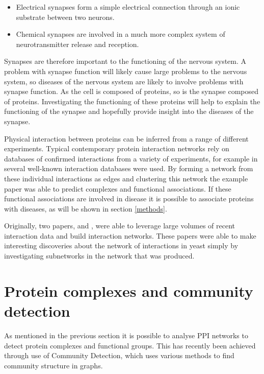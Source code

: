 \begin{itemize}
    \item Electrical synapses form a simple electrical connection through an ionic substrate between two neurons.
    \item Chemical synapses are involved in a much more complex system of neurotransmitter release and reception.
\end{itemize}

Synapses are therefore important to the functioning of the nervous system.
A problem with synapse function will likely cause large problems to the nervous system, so diseases of the nervous system are likely to involve problems with synapse function.
As the cell is composed of proteins, so is the synapse composed of proteins.
Investigating the functioning of these proteins will help to explain the functioning of the synapse and hopefully provide insight into the diseases of the synapse.

Physical interaction between proteins can be inferred from a range of different experiments.
Typical contemporary protein interaction networks rely on databases of confirmed interactions from a variety of experiments, for example in \textcite{kenley_detecting_2011} several well-known interaction databases were used.
By forming a network from these individual interactions as edges and clustering this network the example paper was able to predict complexes and functional associations.
If these functional associations are involved in disease it is possible to associate proteins with diseases, as will be shown in section \ref{methods}.

Originally, two papers, \textcite{ito_comprehensive_2001} and \textcite{uetz_comprehensive_2000}, were able to leverage large volumes of recent interaction data and build interaction networks.
These papers were able to make interesting discoveries about the network of interactions in yeast simply by investigating subnetworks in the network that was produced.

\section{Protein complexes and community detection}

As mentioned in the previous section it is possible to analyse PPI networks to detect protein complexes and functional groups.
This has recently been achieved through use of Community Detection\autocites{chen_identifying_2013,wang_recent_2010}, which uses various methods to find community structure in graphs.

